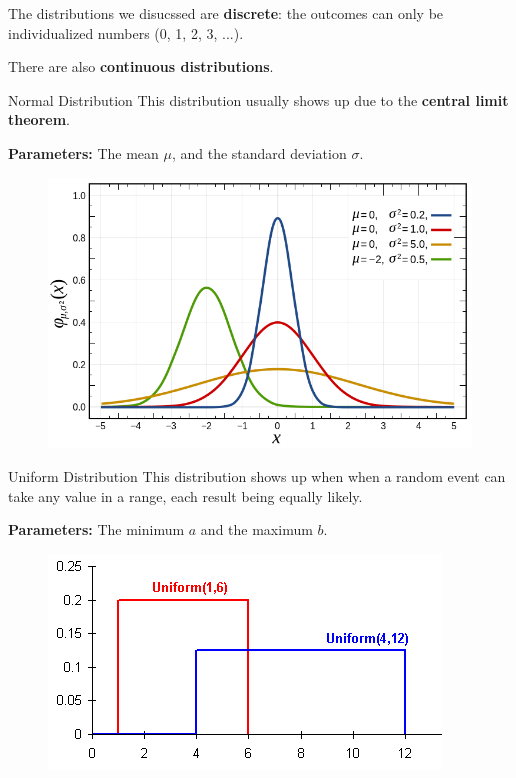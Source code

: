 %
\begin{frame}

The distributions we disucssed are \textbf{discrete}: the outcomes can only be
individualized numbers (0, 1, 2, 3, ...).  

\hfill

There are also \textbf{continuous distributions}.


\end{frame}
%

%
\begin{frame}{Normal Distribution}
This distribution usually shows up due to the \textbf{central limit theorem}.

\hfill

\textbf{Parameters:} The mean $\mu$, and the standard deviation $\sigma$.

  \begin{figure}
    \includegraphics[scale=0.25]{normal-pdf}
  \end{figure}

\end{frame}
%

%
\begin{frame}{Uniform Distribution}
This distribution shows up when when a random event can take any value in a
range, each result being equally likely.

\hfill

\textbf{Parameters:} The minimum $a$ and the maximum $b$.

  \begin{figure}
    \includegraphics[scale=0.5]{uniform-pdf}
  \end{figure}

\end{frame}
%

